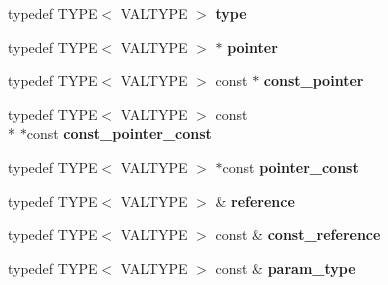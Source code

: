 \begin{DoxyCompactItemize}
\item 
\hypertarget{structglm_1_1detail_1_1genType_a17dbd44c7a86d09e6ea05b72cb02bccf}{typedef T\-Y\-P\-E$<$ V\-A\-L\-T\-Y\-P\-E $>$ {\bfseries type}}\label{structglm_1_1detail_1_1genType_a17dbd44c7a86d09e6ea05b72cb02bccf}

\item 
\hypertarget{structglm_1_1detail_1_1genType_a0b4ddd0af4ae5665c60055e5b622808e}{typedef T\-Y\-P\-E$<$ V\-A\-L\-T\-Y\-P\-E $>$ $\ast$ {\bfseries pointer}}\label{structglm_1_1detail_1_1genType_a0b4ddd0af4ae5665c60055e5b622808e}

\item 
\hypertarget{structglm_1_1detail_1_1genType_ade82fbfd7b15096223e1b133c148b5e2}{typedef T\-Y\-P\-E$<$ V\-A\-L\-T\-Y\-P\-E $>$ const $\ast$ {\bfseries const\-\_\-pointer}}\label{structglm_1_1detail_1_1genType_ade82fbfd7b15096223e1b133c148b5e2}

\item 
\hypertarget{structglm_1_1detail_1_1genType_a4f3f1bc18abdbdba5757fc63052157fa}{typedef T\-Y\-P\-E$<$ V\-A\-L\-T\-Y\-P\-E $>$ const \\*
$\ast$const {\bfseries const\-\_\-pointer\-\_\-const}}\label{structglm_1_1detail_1_1genType_a4f3f1bc18abdbdba5757fc63052157fa}

\item 
\hypertarget{structglm_1_1detail_1_1genType_a4d7745054035d7efed18ec1d7215bbf0}{typedef T\-Y\-P\-E$<$ V\-A\-L\-T\-Y\-P\-E $>$ $\ast$const {\bfseries pointer\-\_\-const}}\label{structglm_1_1detail_1_1genType_a4d7745054035d7efed18ec1d7215bbf0}

\item 
\hypertarget{structglm_1_1detail_1_1genType_a14792cf03ce9cfb37becd2da5d9ae06a}{typedef T\-Y\-P\-E$<$ V\-A\-L\-T\-Y\-P\-E $>$ \& {\bfseries reference}}\label{structglm_1_1detail_1_1genType_a14792cf03ce9cfb37becd2da5d9ae06a}

\item 
\hypertarget{structglm_1_1detail_1_1genType_a509ca374a85f8a9ea319bc5a980d5f1a}{typedef T\-Y\-P\-E$<$ V\-A\-L\-T\-Y\-P\-E $>$ const \& {\bfseries const\-\_\-reference}}\label{structglm_1_1detail_1_1genType_a509ca374a85f8a9ea319bc5a980d5f1a}

\item 
\hypertarget{structglm_1_1detail_1_1genType_a92c8b989f574a63d4e0f5bfc8a4f3a32}{typedef T\-Y\-P\-E$<$ V\-A\-L\-T\-Y\-P\-E $>$ const \& {\bfseries param\-\_\-type}}\label{structglm_1_1detail_1_1genType_a92c8b989f574a63d4e0f5bfc8a4f3a32}

\end{DoxyCompactItemize}

